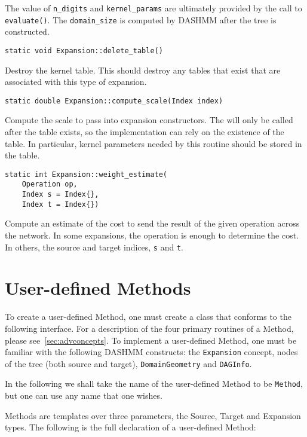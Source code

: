 The value of \texttt{n\_digits} and \texttt{kernel\_params} are ultimately
provided by the call to \texttt{evaluate()}. The
\texttt{domain\_size} is computed by DASHMM after the tree is constructed.

\begin{lstlisting}
static void Expansion::delete_table()
\end{lstlisting}

\noindent Destroy the kernel table. This should destroy any tables that exist
that are associated with this type of expansion.

\begin{lstlisting}
static double Expansion::compute_scale(Index index)
\end{lstlisting}

\noindent Compute the scale to pass into expansion constructors. The will only
be called
after the table exists, so the implementation can rely on the existence of the
table. In particular, kernel parameters needed by this routine should be
stored in the table.

\begin{lstlisting}
static int Expansion::weight_estimate(
    Operation op,
    Index s = Index{},
    Index t = Index{})
\end{lstlisting}

\noindent Compute an estimate of the cost to send the result of the given
operation
across the network. In some expansions, the operation is enough to determine
the cost. In others, the source and target indices, \texttt{s} and \texttt{t}.



\section{User-defined Methods}

To create a user-defined Method, one must create a class that conforms
to the following interface. For a description of the four primary routines
of a Method, please see~\ref{sec:advconcepts}. To implement a user-defined
Method, one must be familiar with the following DASHMM constructs: the
\texttt{Expansion} concept, nodes of the tree (both source and target),
\texttt{DomainGeometry} and \texttt{DAGInfo}.

In the following we shall take the name of the user-defined Method to be
\texttt{Method}, but one can use any name that one wishes.

Methods are templates over three parameters, the Source, Target and Expansion
types. The following is the full declaration of a user-defined Method:

